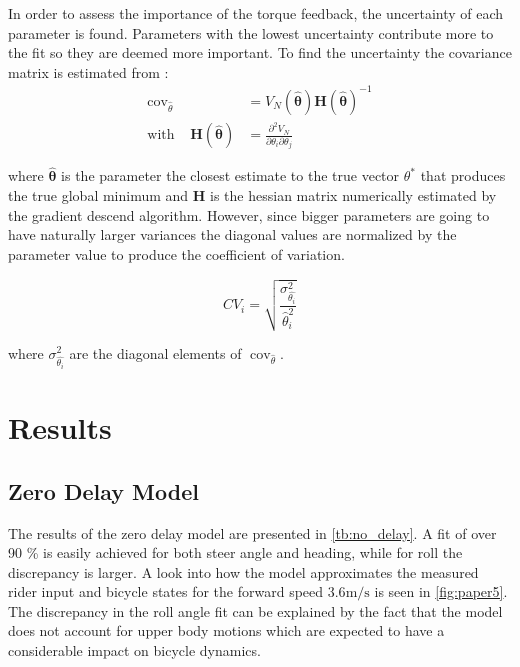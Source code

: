 In order to assess the importance of the torque feedback, the uncertainty of each parameter is found. Parameters with the lowest uncertainty contribute more to the fit so they are deemed more important. To find the uncertainty the covariance matrix is estimated from :
\begin{align}
    \operatorname{cov}_{\hat{\theta}}  &=V_N(\boldsymbol{\hat{\theta}})\boldsymbol{H}(\boldsymbol{\hat{\theta}})^{-1}\\ \text{with} \;\;\;\;  \boldsymbol{H}(\boldsymbol{\hat{\theta}})&= \frac{\partial^{2} V_N}{\partial \theta_{i} \partial \theta_{j}}
\end{align}

where \ensuremath{\boldsymbol{\hat{\theta}}} is the parameter  the closest estimate to the true vector \ensuremath{\theta^*} that produces the true global minimum and \ensuremath{\boldsymbol{H}} is the hessian matrix numerically estimated by the gradient descend algorithm.  However, since bigger parameters are going to have naturally larger variances the diagonal values are normalized by the parameter value to produce the coefficient of variation.

\begin{equation}
    CV_{i}=\sqrt{\frac{\sigma^{2}_{\hat{\theta_i}}}{\hat{\theta}_i^2}}
    \end{equation}

    where \ensuremath{\sigma^{2}_{\hat{\theta_i}}} are the diagonal elements of \ensuremath{ \operatorname{cov}_{\hat{\theta}}}.


\section{Results}


\subsection{Zero Delay Model}
The results of the zero delay model are presented in \cref{tb:no_delay}. A fit of over 90 \% is easily achieved for both steer angle and heading, while for roll the discrepancy is larger. A  look into how the model approximates the measured rider input and bicycle states for the forward speed \ensuremath{3.6 \si{\meter\per\second}} is seen in \cref{fig:paper5}. The discrepancy in the roll angle fit can be explained by the fact that the model does not account for upper body motions which are expected to have a considerable impact on bicycle dynamics. 

